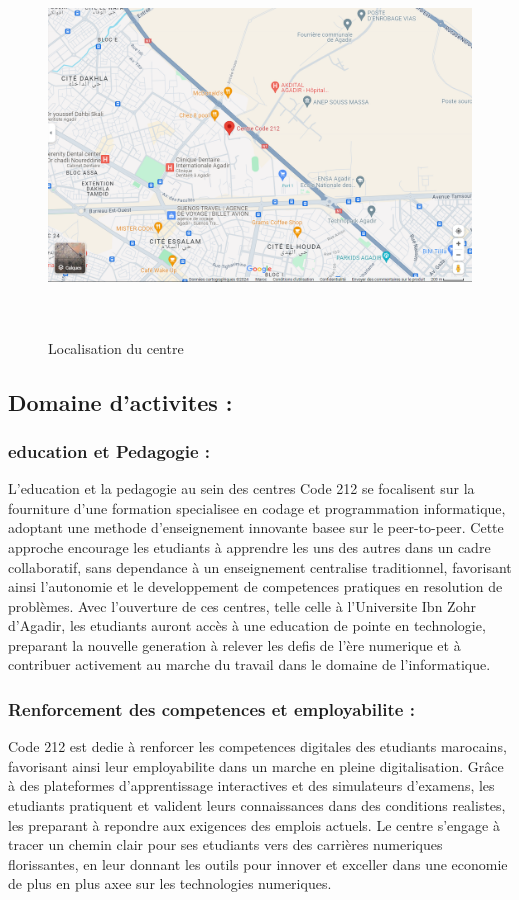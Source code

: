 \begin{figure}[H]
\centering
\includegraphics[height=10cm , width=\textwidth]{assets/images/maps.png}
\caption{Localisation du centre}
\label{fig:localisationcentre}
\end{figure}

\subsection{Domaine d'activites :}

\subsubsection{education et Pedagogie :}
L'education et la pedagogie au sein des centres Code 212 se focalisent sur la fourniture d'une formation specialisee en codage et programmation informatique, adoptant une methode d'enseignement innovante basee sur le peer-to-peer. Cette approche encourage les etudiants à apprendre les uns des autres dans un cadre collaboratif, sans dependance à un enseignement centralise traditionnel, favorisant ainsi l'autonomie et le developpement de competences pratiques en resolution de problèmes. Avec l'ouverture de ces centres, telle celle à l'Universite Ibn Zohr d'Agadir, les etudiants auront accès à une education de pointe en technologie, preparant la nouvelle generation à relever les defis de l'ère numerique et à contribuer activement au marche du travail dans le domaine de l'informatique.

\subsubsection{Renforcement des competences et employabilite :}
Code 212 est dedie à renforcer les competences digitales des etudiants marocains, favorisant ainsi leur employabilite dans un marche en pleine digitalisation. Grâce à des plateformes d'apprentissage interactives et des simulateurs d'examens, les etudiants pratiquent et valident leurs connaissances dans des conditions realistes, les preparant à repondre aux exigences des emplois actuels. Le centre s'engage à tracer un chemin clair pour ses etudiants vers des carrières numeriques florissantes, en leur donnant les outils pour innover et exceller dans une economie de plus en plus axee sur les technologies numeriques.
